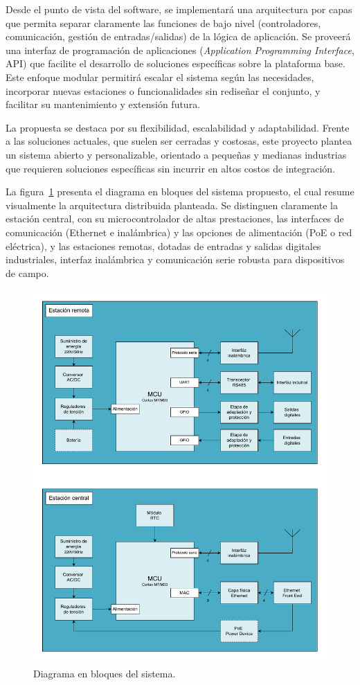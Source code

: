 \documentclass[
11pt, %
]{charter}
\begin{document}
Desde el punto de vista del software, se implementará una arquitectura por capas que permita separar claramente las funciones de bajo nivel (controladores, comunicación, gestión de entradas/salidas) de la lógica de aplicación. Se proveerá una interfaz de programación de aplicaciones (\textit{Application Programming Interface}, API) que facilite el desarrollo de soluciones específicas sobre la plataforma base. Este enfoque modular permitirá escalar el sistema según las necesidades, incorporar nuevas estaciones o funcionalidades sin rediseñar el conjunto, y facilitar su mantenimiento y extensión futura.

La propuesta se destaca por su flexibilidad, escalabilidad y adaptabilidad. Frente a las soluciones actuales, que suelen ser cerradas y costosas, este proyecto plantea un sistema abierto y personalizable, orientado a pequeñas y medianas industrias que requieren soluciones específicas sin incurrir en altos costos de integración.

\newpage
La figura \ref{fig:diagBloques} presenta el diagrama en bloques del sistema propuesto, el cual resume visualmente la arquitectura distribuida planteada. Se distinguen claramente la estación central, con su microcontrolador de altas prestaciones, las interfaces de comunicación (Ethernet e inalámbrica) y las opciones de alimentación (PoE o red eléctrica), y las estaciones remotas, dotadas de entradas y salidas digitales industriales, interfaz inalámbrica y comunicación serie robusta para dispositivos de campo.

\begin{figure}[htpb]
\centering 
\includegraphics[width=.9\textwidth]{./Figuras/diagBloques.pdf}
\caption{Diagrama en bloques del sistema.}
\label{fig:diagBloques}
\end{figure}
\end{document}
